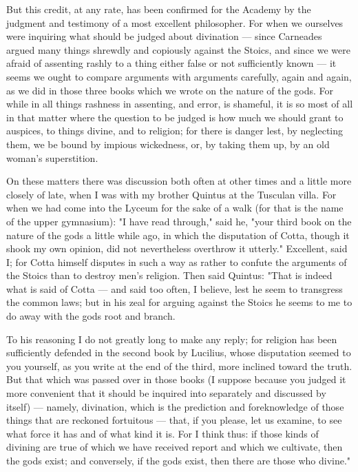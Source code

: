  But this credit, at any rate, has been confirmed for the Academy by the judgment and testimony of a most excellent philosopher. For when we ourselves were inquiring what should be judged about divination — since Carneades argued many things shrewdly and copiously against the Stoics, and since we were afraid of assenting rashly to a thing either false or not sufficiently known — it seems we ought to compare arguments with arguments carefully, again and again, as we did in those three books which we wrote on the nature of the gods. For while in all things rashness in assenting, and error, is shameful, it is so most of all in that matter where the question to be judged is how much we should grant to auspices, to things divine, and to religion; for there is danger lest, by neglecting them, we be bound by impious wickedness, or, by taking them up, by an old woman's superstition.

 On these matters there was discussion both often at other times and a little more closely of late, when I was with my brother Quintus at the Tusculan villa. For when we had come into the Lyceum for the sake of a walk (for that is the name of the upper gymnasium): "I have read through," said he, "your third book on the nature of the gods a little while ago, in which the disputation of Cotta, though it shook my own opinion, did not nevertheless overthrow it utterly." Excellent, said I; for Cotta himself disputes in such a way as rather to confute the arguments of the Stoics than to destroy men's religion. Then said Quintus: "That is indeed what is said of Cotta — and said too often, I believe, lest he seem to transgress the common laws; but in his zeal for arguing against the Stoics he seems to me to do away with the gods root and branch.

 To his reasoning I do not greatly long to make any reply; for religion has been sufficiently defended in the second book by Lucilius, whose disputation seemed to you yourself, as you write at the end of the third, more inclined toward the truth. But that which was passed over in those books (I suppose because you judged it more convenient that it should be inquired into separately and discussed by itself) — namely, divination, which is the prediction and foreknowledge of those things that are reckoned fortuitous — that, if you please, let us examine, to see what force it has and of what kind it is. For I think thus: if those kinds of divining are true of which we have received report and which we cultivate, then the gods exist; and conversely, if the gods exist, then there are those who divine."


